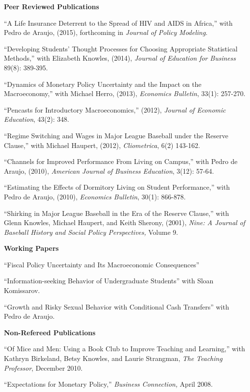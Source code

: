\documentclass[11pt]{article}
\newcommand{\bd}{\begin{description}}
\newcommand{\ed}{\end{description}}
\newcommand{\toprule}{\par\vspace*{2pt}\noindent{\hrule\hfill}\par\vspace*{1pt}}
\begin{document}
\textbf{Peer Reviewed Publications} \toprule
\bd
\item ``A Life Insurance Deterrent to the Spread of HIV and AIDS in Africa,'' with Pedro de Araujo, (2015), forthcoming in \textit{Journal of Policy Modeling}.
\item ``Developing Students' Thought Processes for Choosing Appropriate Statistical Methods,'' with Elizabeth Knowles, (2014), \textit{Journal of Education for Business} 89(8): 389-395.
\item ``Dynamics of Monetary Policy Uncertainty and the Impact on the Macroeconomy,'' with Michael Herro, (2013), \textit{Economics Bulletin}, 33(1): 257-270.
\item ``Pencasts for Introductory Macroeconomics,'' (2012), \textit{Journal of Economic Education}, 43(2): 348.
\item ``Regime Switching and Wages in Major League Baseball under the Reserve Clause,'' with Michael Haupert, (2012), \textit{Cliometrica}, 6(2) 143-162.
\item ``Channels for Improved Performance From Living on Campus,'' with Pedro de Araujo, (2010), \textit{American Journal of Business Education}, 3(12): 57-64.
\item ``Estimating the Effects of Dormitory Living on Student Performance,'' with Pedro de Araujo, (2010), \textit{Economics Bulletin}, 30(1): 866-878.
\item ``Shirking in Major League Baseball in the Era of the Reserve Clause,'' with Glenn Knowles, Michael Haupert, and Keith Sherony, (2001), \textit{Nine: A Journal of Baseball History and Social Policy Perspectives,}  Volume 9. \\
\ed

\textbf{Working Papers} \toprule
\bd
\item ``Fiscal Policy Uncertainty and Its Macroeconomic Consequences''
\item ``Information-seeking Behavior of Undergraduate Students'' with Sloan Komissarov.
\item ``Growth and Risky Sexual Behavior with Conditional Cash Transfers'' with Pedro de Araujo. 
\ed

\textbf{Non-Refereed Publications} \toprule
\bd
\item ``Of Mice and Men: Using a Book Club to Improve Teaching and Learning,'' with Kathryn Birkeland, Betsy Knowles, and Laurie Strangman, \textit{The Teaching Professor}, December 2010.
\item ``Expectations for Monetary Policy,'' \textit{Business Connection,}  April 2008. \\ 
\ed
\end{document}
